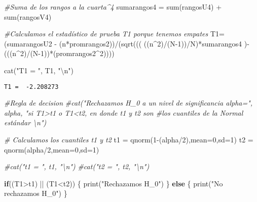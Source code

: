 \documentclass[
  a4paper,
  oneside,
  openany]{book}
\newenvironment{Shaded}{\begin{snugshade}}{\end{snugshade}}
\newcommand{\AttributeTok}[1]{\textcolor[rgb]{0.77,0.63,0.00}{#1}}
\newcommand{\CommentTok}[1]{\textcolor[rgb]{0.56,0.35,0.01}{\textit{#1}}}
\newcommand{\ControlFlowTok}[1]{\textcolor[rgb]{0.13,0.29,0.53}{\textbf{#1}}}
\newcommand{\DecValTok}[1]{\textcolor[rgb]{0.00,0.00,0.81}{#1}}
\newcommand{\FunctionTok}[1]{\textcolor[rgb]{0.00,0.00,0.00}{#1}}
\newcommand{\NormalTok}[1]{#1}
\newcommand{\OtherTok}[1]{\textcolor[rgb]{0.56,0.35,0.01}{#1}}
\newcommand{\SpecialCharTok}[1]{\textcolor[rgb]{0.00,0.00,0.00}{#1}}
\newcommand{\StringTok}[1]{\textcolor[rgb]{0.31,0.60,0.02}{#1}}
\begin{document}
\begin{Shaded}
\begin{Highlighting}[]
\CommentTok{\#Suma de los rangos a la cuarta\^{}4}
\NormalTok{sumarangos4 }\OtherTok{=} \FunctionTok{sum}\NormalTok{(rangosU4) }\SpecialCharTok{+} \FunctionTok{sum}\NormalTok{(rangosV4)}

\CommentTok{\#Calculamos el estadístico de prueba T1 porque tenemos empates}
\NormalTok{T1}\OtherTok{=}\NormalTok{(sumarangosU2 }\SpecialCharTok{{-}}\NormalTok{ (n}\SpecialCharTok{*}\NormalTok{promrangos2))}\SpecialCharTok{/}\NormalTok{(}\FunctionTok{sqrt}\NormalTok{(((      ((n}\SpecialCharTok{\^{}}\DecValTok{2}\NormalTok{)}\SpecialCharTok{/}\NormalTok{(N}\DecValTok{{-}1}\NormalTok{))}\SpecialCharTok{/}\NormalTok{N)}\SpecialCharTok{*}\NormalTok{sumarangos4 )}\SpecialCharTok{{-}}\NormalTok{(((n}\SpecialCharTok{\^{}}\DecValTok{2}\NormalTok{)}\SpecialCharTok{/}\NormalTok{(N}\DecValTok{{-}1}\NormalTok{))}\SpecialCharTok{*}\NormalTok{(promrangos2}\SpecialCharTok{\^{}}\DecValTok{2}\NormalTok{))))}

\FunctionTok{cat}\NormalTok{(}\StringTok{"T1 = "}\NormalTok{, T1, }\StringTok{"}\SpecialCharTok{\textbackslash{}n}\StringTok{"}\NormalTok{)}
\end{Highlighting}
\end{Shaded}

\begin{verbatim}
T1 =  -2.208273 
\end{verbatim}

\begin{Shaded}
\begin{Highlighting}[]
\CommentTok{\#Regla de decision}
\CommentTok{\#cat("Rechazamos H\_0 a un nivel de significancia alpha=", alpha, "si T1\textgreater{}t1 o T1\textless{}t2, en donde t1 y t2 son \#los cuantiles de la Normal estándar \textbackslash{}n")}

\CommentTok{\# Calculamos los cuantiles t1 y t2 }
\NormalTok{t1 }\OtherTok{=} \FunctionTok{qnorm}\NormalTok{(}\DecValTok{1}\SpecialCharTok{{-}}\NormalTok{(alpha}\SpecialCharTok{/}\DecValTok{2}\NormalTok{),}\AttributeTok{mean=}\DecValTok{0}\NormalTok{,}\AttributeTok{sd=}\DecValTok{1}\NormalTok{)}
\NormalTok{t2 }\OtherTok{=} \FunctionTok{qnorm}\NormalTok{(alpha}\SpecialCharTok{/}\DecValTok{2}\NormalTok{,}\AttributeTok{mean=}\DecValTok{0}\NormalTok{,}\AttributeTok{sd=}\DecValTok{1}\NormalTok{)}

\CommentTok{\#cat("t1 = ", t1, "\textbackslash{}n")}
\CommentTok{\#cat("t2 = ", t2, "\textbackslash{}n")}

\ControlFlowTok{if}\NormalTok{((T1}\SpecialCharTok{\textgreater{}}\NormalTok{t1) }\SpecialCharTok{||}\NormalTok{ (T1}\SpecialCharTok{\textless{}}\NormalTok{t2)) \{}
  \FunctionTok{print}\NormalTok{(}\StringTok{"Rechazamos H\_0"}\NormalTok{)}
\NormalTok{\} }\ControlFlowTok{else}\NormalTok{ \{}
  \FunctionTok{print}\NormalTok{(}\StringTok{"No rechazamos H\_0"}\NormalTok{)}
\NormalTok{\}}
\end{Highlighting}
\end{Shaded}
\end{document}
